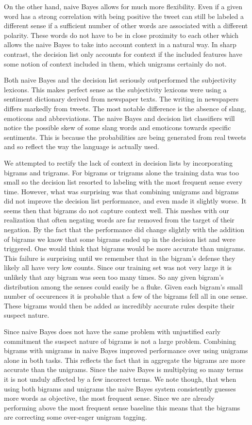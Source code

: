 \documentclass[11pt]{article}
\begin{document}
On the other hand, naive Bayes allows for much more flexibility. Even if a given word has a strong correlation with being positive the tweet can still be labeled a different sense if a sufficient number of other words are associated with a different polarity. These words do not have to be in close proximity to each other which allows the naive Bayes to take into account context in a natural way. In sharp contrast, the decision list only accounts for context if the included features have some notion of context included in them, which unigrams certainly do not.

Both naive Bayes and the decision list seriously outperformed the subjectivity lexicons. This makes perfect sense as the subjectivity lexicons were using a sentiment dictionary derived from newspaper texts. The writing in newspapers differs markedly from tweets. The most notable difference is the absence of slang, emoticons and abbreviations. The naive Bayes and decision list classifiers will notice the possible skew of some slang words and emoticons towards specific sentiments. This is because the probabilities are being generated from real tweets and so reflect the way the language is actually used.

We attempted to rectify the lack of context in decision lists by incorporating bigrams and trigrams. For bigrams or trigrams alone the training data was too small so the decision list resorted to labeling with the most frequent sense every time. However, what was surprising was that combining unigrams and bigrams did not improve the decision list performance, and even made it slightly worse. It seems then that bigrams do not capture context well. This meshes with our realization that often negating words are far removed from the target of their negation. By the fact that the performance did change slightly with the addition of bigrams we know that some bigrams ended up in the decision list and were triggered. One would think that bigrams would be more accurate than unigrams. This failure is surprising until we remember that in the bigram's defense they likely all have very low counts. Since our training set was not very large it is unlikely that any bigram was seen too many times. So any given bigram's distribution among the senses could easily be a fluke. Given each bigram's small number of occurences it is probable that a few of the bigrams fell all in one sense. These bigrams would then be added as incredibly accurate rules despite their suspect nature.

Since naive Bayes does not have the same problem with unjustified early commitment the suspect nature of bigrams is not a large problem. Combining bigrams with unigrams in naive Bayes improved performance over using unigrams alone in both tasks. This reflects the fact that in aggregate the bigrams are more accurate than the unigrams. Since the naive Bayes is multiplying so many terms it is not unduly affected by a few incorrect terms. We note though, that when using both bigrams and unigrams the naive Bayes system consistently guesses more words as objective, the most frequent sense. Since we are already performing above the most frequent sense baseline this means that the bigrams are correcting some over-eager unigram tagging. 
\end{document}

